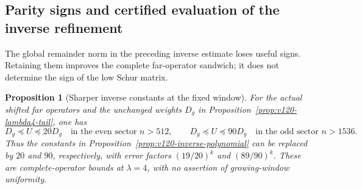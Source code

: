 \documentclass[11pt]{article}
\newtheorem{proposition}[theorem]{Proposition}
\theoremstyle{remark}
\begin{document}
\subsection*{Parity signs and certified evaluation of the inverse refinement}
The global remainder norm in the preceding inverse estimate loses useful
signs. Retaining them improves the complete far-operator sandwich;
it does not determine the sign of the low Schur matrix.

\begin{proposition}[Sharper inverse constants at the fixed window]
\label{prop:v122-parity-inverse}
For the actual shifted far operators and the unchanged weights $D_g$
in Proposition~\ref{prop:v120-lambda4-tail}, one has
\[
 D_g\preceq U\preceq20D_g\quad\text{in the even sector }n>512,
 \qquad
 D_g\preceq U\preceq90D_g\quad\text{in the odd sector }n>1536.
\]
Thus the constants in Proposition~\ref{prop:v120-inverse-polynomial}
can be replaced by $20$ and $90$, respectively, with error factors
$(19/20)^k$ and $(89/90)^k$. These are complete-operator bounds
at $\lambda=4$, with no assertion of growing-window uniformity.
\end{proposition}
\end{document}
